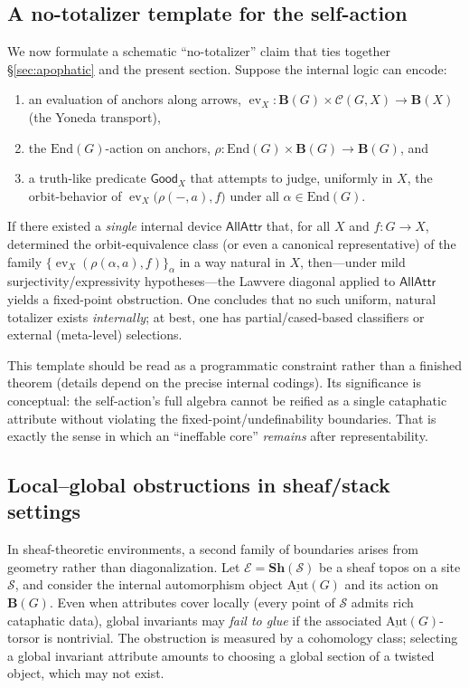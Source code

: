 \documentclass[11pt]{article}
\theoremstyle{upright}
\begin{document}
\subsection{A no-totalizer template for the self-action}\label{subsec:nototal}
We now formulate a schematic “no-totalizer” claim that ties together \S\ref{sec:apophatic} and the present section. Suppose the internal logic can encode:
\begin{enumerate}[leftmargin=2em,label=(\roman*)]
  \item an evaluation of anchors along arrows, \( \operatorname{ev}_X:\mathbf B(G)\times \mathcal C(G,X) \to \mathbf B(X)\) (the Yoneda transport),
  \item the \(\mathrm{End}(G)\)-action on anchors, \( \rho:\mathrm{End}(G)\times \mathbf B(G)\to \mathbf B(G)\), and
  \item a truth-like predicate \(\mathsf{Good}_X\) that attempts to judge, uniformly in \(X\), the orbit-behavior of \(\operatorname{ev}_X\big(\rho(-,a),f\big)\) under all \(\alpha\in\mathrm{End}(G)\).
\end{enumerate}
If there existed a \emph{single} internal device \(\mathsf{AllAttr}\) that, for all \(X\) and \(f:G\to X\), determined the orbit-equivalence class (or even a canonical representative) of the family \(\{\operatorname{ev}_X(\rho(\alpha,a),f)\}_{\alpha}\) in a way natural in \(X\), then—under mild surjectivity/expressivity hypotheses—the Lawvere diagonal applied to \(\mathsf{AllAttr}\) yields a fixed-point obstruction. One concludes that no such uniform, natural totalizer exists \emph{internally}; at best, one has partial/cased-based classifiers or external (meta-level) selections.

This template should be read as a programmatic constraint rather than a finished theorem (details depend on the precise internal codings). Its significance is conceptual: the self-action’s full algebra cannot be reified as a single cataphatic attribute without violating the fixed-point/undefinability boundaries. That is exactly the sense in which an “ineffable core” \emph{remains} after representability.

\subsection{Local--global obstructions in sheaf/stack settings}
In sheaf-theoretic environments, a second family of boundaries arises from geometry rather than diagonalization. Let \(\mathcal E=\mathbf{Sh}(\mathcal S)\) be a sheaf topos on a site \(\mathcal S\), and consider the internal automorphism object \(\underline{\mathrm{Aut}}(G)\) and its action on \(\mathbf B(G)\). Even when attributes cover locally (every point of \(\mathcal S\) admits rich cataphatic data), global invariants may \emph{fail to glue} if the associated \(\underline{\mathrm{Aut}}(G)\)-torsor is nontrivial. The obstruction is measured by a cohomology class; selecting a global invariant attribute amounts to choosing a global section of a twisted object, which may not exist.
\end{document}
